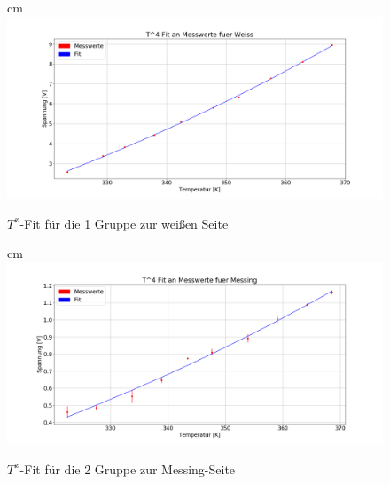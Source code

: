 \documentclass[a4paper, 11pt]{article}
\begin{document}
\begin{center}
\begin{figure}[H]
	 cm
	\includegraphics[scale=0.42]{Bilder/Gruppe1_Fit_Weiss.png}%
	\caption[$T^x$-Fit für die 1 Gruppe zur weißen Seite]{$T^x$-Fit für die 1 Gruppe zur weißen Seite}%
	\label{pic:Abbildung 2}%
\end{figure}

\begin{figure}[H]
	 cm
	\includegraphics[scale=0.42]{Bilder/Gruppe2_Fit_Messing.png}%
	\caption[$T^x$-Fit für die 2 Gruppe zur Messing-Seite]{$T^x$-Fit für die 2 Gruppe zur Messing-Seite}%
	\label{pic:Abbildung 2}%
\end{figure}

\end{center}

\newpage
\listoffigures
\listoftables
\end{document}
